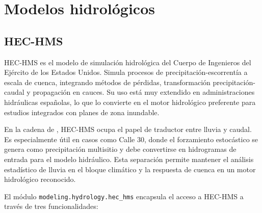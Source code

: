 \section{Modelos hidrológicos}

\subsection{HEC-HMS}

HEC-HMS \parencite{scharffenberg2016hechms} es el modelo de simulación hidrológica del Cuerpo de Ingenieros del Ejército de los Estados Unidos. Simula procesos de precipitación-escorrentía a escala de cuenca, integrando métodos de pérdidas, transformación precipitación-caudal y propagación en cauces. Su uso está muy extendido en administraciones hidráulicas españolas, lo que lo convierte en el motor hidrológico preferente para estudios integrados con planes de zona inundable.

En la cadena de \pyhydra, HEC-HMS ocupa el papel de traductor entre lluvia y caudal. Es especialmente útil en casos como Calle 30, donde el forzamiento estocástico se genera como precipitación multisitio y debe convertirse en hidrogramas de entrada para el modelo hidráulico. Esta separación permite mantener el análisis estadístico de lluvia en el bloque climático y la respuesta de cuenca en un motor hidrológico reconocido.

El módulo \texttt{modeling.hydrology.hec\_hms} encapsula el acceso a HEC-HMS a través de tres funcionalidades:

